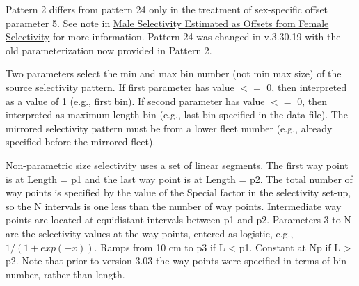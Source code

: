 \hypertarget{Pattern2}{}
Pattern 2 differs from pattern 24 only in the treatment of sex-specific offset parameter 5. See note in \hyperlink{MaleSelectivityOffset}{Male Selectivity Estimated as Offsets from Female Selectivity} for more information. Pattern 24 was changed in v.3.30.19 with the old parameterization now provided in Pattern 2.

\hypertarget{MirrorSelectivity}{}
Two parameters select the min and max bin number (not min max size) of the source selectivity pattern. If first parameter has value $<=$ 0, then interpreted as a value of 1 (e.g., first bin). If second parameter has value $<=$ 0, then interpreted as maximum length bin (e.g., last bin specified in the data file). The mirrored selectivity pattern must be from a lower fleet number (e.g., already specified before the mirrored fleet).

\hypertarget{NonParamSelectivity}{}
Non-parametric size selectivity uses a set of linear segments. The first way point is at Length = p1 and the last way point is at Length = p2. The total number of way points is specified by the value of the Special factor in the selectivity set-up, so the N intervals is one less than the number of way points. Intermediate way points are located at equidistant intervals between p1 and p2. Parameters 3 to N are the selectivity values at the way points, entered as logistic, e.g., $1/(1+exp(-x))$. Ramps from 10 cm to p3 if L < p1. Constant at Np if L > p2. Note that prior to version 3.03 the way points were specified in terms of bin number, rather than length.


